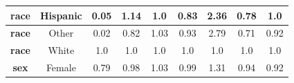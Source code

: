 \documentclass[oneside,openright,titlepage,numbers=noenddot,openany,headinclude,footinclude=true,
cleardoublepage=empty,abstractoff,BCOR=5mm,paper=a4,fontsize=12pt,main=spanish]{scrreprt}
\begin{document}
\begin{table}[H]
{\begin{tabular}{|c|c|c|c|c|c|c|c|c|}
\textbf{race}                                                     & Hispanic                                                           & {\color[HTML]{FE0000} 0.05}                                      & {\color[HTML]{32CB00} 1.14}                                      & {\color[HTML]{32CB00} 1.0}                                       & {\color[HTML]{32CB00} 0.83}                                      & {\color[HTML]{FE0000} 2.36}                                      & {\color[HTML]{FE0000} 0.78}                                      & {\color[HTML]{32CB00} 1.0}                                       \\ \hline
\textbf{race}                                                     & Other                                                              & {\color[HTML]{FE0000} 0.02}                                      & {\color[HTML]{32CB00} 0.82}                                      & {\color[HTML]{32CB00} 1.03}                                      & {\color[HTML]{32CB00} 0.93}                                      & {\color[HTML]{FE0000} 2.79}                                      & {\color[HTML]{FE0000} 0.71}                                      & {\color[HTML]{32CB00} 0.92}                                      \\ \hline
\textbf{race}                                                     & White                                                              & {\color[HTML]{3166FF} 1.0}                                       & {\color[HTML]{3166FF} 1.0}                                       & {\color[HTML]{3166FF} 1.0}                                       & {\color[HTML]{3166FF} 1.0}                                       & {\color[HTML]{3166FF} 1.0}                                       & {\color[HTML]{3166FF} 1.0}                                       & {\color[HTML]{3166FF} 1.0}                                       \\ \hline
\textbf{sex}                                                      & Female                                                             & {\color[HTML]{FE0000} 0.79}                                      & {\color[HTML]{32CB00} 0.98}                                      & {\color[HTML]{32CB00} 1.03}                                      & {\color[HTML]{32CB00} 0.99}                                      & {\color[HTML]{FE0000} 1.31}                                      & {\color[HTML]{32CB00} 0.94}                                      & {\color[HTML]{32CB00} 0.92}                                      \\ \hline

\end{tabular}}
\end{table}
\end{document}

